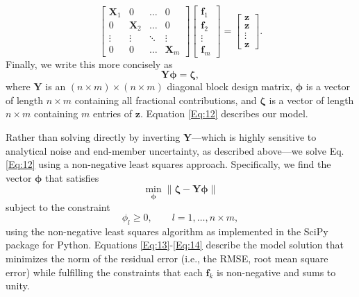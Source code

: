\documentclass{amsart}
\begin{document}
\begin{equation}\label{Eq:11}
	\begin{bmatrix}
		\bm{X}_1 &  0 & \dots & 0\\
		0 & \bm{X}_2  & \dots & 0\\
		\vdots & \vdots & \ddots & \vdots \\
		0 & 0 & \dots & \bm{X}_m
	\end{bmatrix}
	\begin{bmatrix}
		\bm{f}_1 \\
		\bm{f}_2 \\
		\vdots \\
		\bm{f}_m
	\end{bmatrix}
	=
	\begin{bmatrix}
		\bm{z} \\
		\bm{z} \\
		\vdots \\
		\bm{z}
	\end{bmatrix}.
\end{equation}
%
Finally, we write this more concisely as
%
\begin{equation}\label{Eq:12}
	\bm{Y} \bm{\phi} = \bm{\zeta},
\end{equation}
%
where $\bm{Y}$ is an $(n \times m) \times (n \times m)$ diagonal block design matrix, $\bm{\phi}$ is a vector of length $n \times m$ containing all fractional contributions, and $\bm{\zeta}$ is a vector of length $n \times m$ containing $m$ entries of $\bm{z}$. Equation \ref{Eq:12} describes our model.

Rather than solving directly by inverting $\bm{Y}$---which is highly sensitive to analytical noise and end-member uncertainty, as described above---we solve Eq. \ref{Eq:12} using a non-negative least squares approach. Specifically, we find the vector $\bm{\phi}$ that satisfies
%
\begin{equation}\label{Eq:13}
	\min_{\bm{\phi}} \| \bm{\zeta} - \bm{Y} \bm{\phi} \|
\end{equation}
%
subject to the constraint
%
\begin{equation}\label{Eq:14}
	\phi_l \geq 0, \qquad l = 1, \dots, n \times m,
\end{equation}
%
using the non-negative least squares algorithm as implemented in the SciPy package for Python. Equations \ref{Eq:13}-\ref{Eq:14} describe the model solution that minimizes the norm of the residual error (i.e., the RMSE, root mean square error) while fulfilling the constraints that each $\bm{f}_k$ is non-negative and sums to unity.
\end{document}
